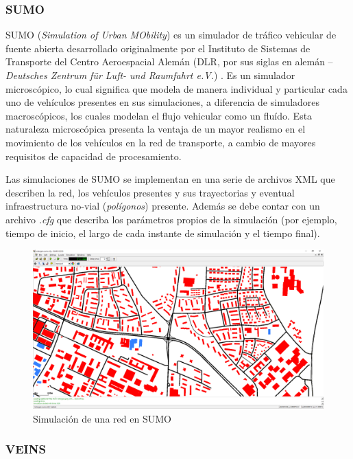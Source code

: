 \documentclass[11pt,letterpaper]{article}
\begin{document}
\subsubsection{SUMO}

SUMO (\emph{Simulation of Urban MObility}) es un simulador de tráfico vehicular de fuente abierta desarrollado originalmente por el Instituto de Sistemas de Transporte del Centro Aeroespacial Alemán (DLR, por sus siglas en alemán -- \emph{Deutsches Zentrum für Luft- und Raumfahrt e.V.}) \cite{sumo}. Es un simulador microscópico, lo cual significa que modela de manera individual y particular cada uno de vehículos presentes en sus simulaciones, a diferencia de simuladores macroscópicos, los cuales modelan el flujo vehicular como un fluído. Esta naturaleza microscópica presenta la ventaja de un mayor realismo en el movimiento de los vehículos en la red de transporte, a cambio de mayores requisitos de capacidad de procesamiento.

Las simulaciones de SUMO se implementan en una serie de archivos XML que describen la red, los vehículos presentes y sus trayectorias y eventual infraestructura no-vial (\emph{polígonos}) presente. Además se debe contar con un archivo \emph{.cfg} que describa los parámetros propios de la simulación (por ejemplo, tiempo de inicio, el largo de cada instante de simulación y el tiempo final).

\begin{figure}[ht]
  \centering
  \includegraphics[width=\linewidth]{sumo_demo.png}
  \caption{Simulación de una red en SUMO}
  \label{fig:sumo_demo}
\end{figure}

\subsubsection{VEINS}
\end{document}
